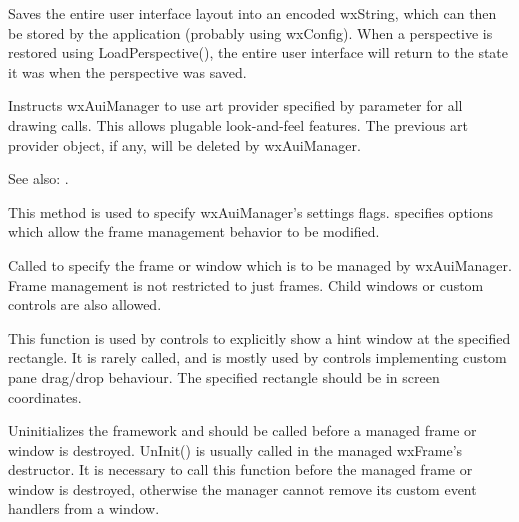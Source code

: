 
Saves the entire user interface layout into an encoded wxString, which
can then be stored by the application (probably using wxConfig). When
a perspective is restored using LoadPerspective(), the entire user
interface will return to the state it was when the perspective was saved.

\label{wxauimanagersetartprovider}


Instructs wxAuiManager to use art provider specified by parameter
 for all drawing calls. This allows plugable
look-and-feel features. The previous art provider object, if any,
will be deleted by wxAuiManager.

See also: .

\label{wxauimanagersetflags}


This method is used to specify wxAuiManager's settings flags. 
specifies options which allow the frame management behavior to be modified.

\label{wxauimanagersetmanagedwindow}


Called to specify the frame or window which is to be managed by wxAuiManager.  Frame management is not restricted to just frames.  Child windows or custom controls are also allowed.

\label{wxauimanagershowhint}


This function is used by controls to explicitly show a hint window at the specified rectangle.  It is rarely called, and is mostly used by controls implementing custom pane drag/drop behaviour.  The specified rectangle should be in screen coordinates.

\label{wxauimanageruninit}


Uninitializes the framework and should be called before a managed frame or window is destroyed. UnInit() is usually called in the managed wxFrame's destructor.  It is necessary to call this function before the managed frame or window is destroyed, otherwise the manager cannot remove its custom event handlers from a window.

